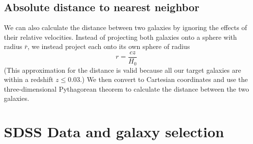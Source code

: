 \subsection{Absolute distance to nearest neighbor}

We can also calculate the distance between two galaxies by ignoring the effects 
of their relative velocities.  Instead of projecting both galaxies onto a sphere 
with radius $\bar{r}$, we instead project each onto its own sphere of radius 
\begin{equation}
    r = \frac{cz}{H_0}
\end{equation}
(This approximation for the distance is valid because all our target galaxies 
are within a redshift $z \leq 0.03$.)  We then convert to Cartesian coordinates 
and use the three-dimensional Pythagorean theorem to calculate the distance 
between the two galaxies.




\section[SDSS Data]{SDSS Data and galaxy selection}

